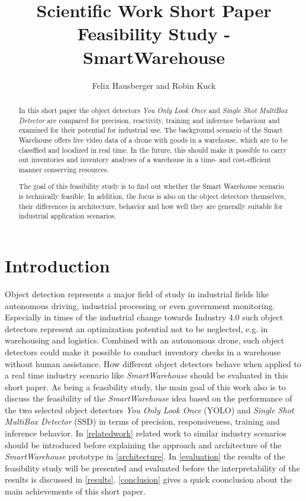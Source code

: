 \documentclass[a4paper, 10pt, journal]{wissarbIEEE}      %
\title{\LARGE \bf Scientific Work Short Paper \\Feasibility Study - SmartWarehouse}
\author{Felix Hausberger and Robin Kuck}
\begin{document}
\maketitle

\begin{abstract}

In this short paper the object detectors \textit{You Only Look Once} and \textit{Single Shot MultiBox Detector} are compared for precision, reactivity, training and inference behaviour and examined for their potential for industrial use. The background scenario of the Smart Warehouse offers live video data of a drone with goods in a warehouse, which are to be classffied and localized in real time. In the future, this should make it possible to carry out inventories and inventory analyses of a warehouse in a time- and cost-efficient manner conserving resources.

The goal of this feasibility study is to find out whether the Smart Warehouse scenario is technically feasible. In addition, the focus is also on the object detectors themselves, their differences in architecture, behavior and how well they are generally suitable for industrial application scenarios.

\end{abstract}

\section{Introduction}

Object detection represents a major field of study in industrial fields like autonomous driving, industrial processing or even government monitoring. Especially in times of the industrial change towards Industry 4.0 such object detectors represent an optimization potential not to be neglected, e.g. in warehousing and logistics. Combined with an autonomous drone, such object detectors could make it possible to conduct inventory checks in a warehouse without human assistance. How different object detectors behave when applied to a real time industry scenario like \textit{SmartWarehouse} should be evaluated in this short paper. As being a feasibility study, the main goal of this work also is to discuss the feasibility of the \textit{SmartWarehouse} idea based on the performance of the two selected object detectors \textit{You Only Look Once} (YOLO) and \textit{Single Shot MultiBox Detector} (SSD) in terms of precision, responsiveness, training and inference behavior. In \autoref{relatedwork} related work to similar industry scenarios should be introduced before explaining the approach and architecture of the \textit{SmartWarehouse} prototype in \autoref{architecture}. In \autoref{evaluation} the results of the feasibility study will be presented and evaluated before the interpretability of the results is discussed in \autoref{results}. \autoref{conclusion} gives a quick coonclusion about the main achievements of this short paper.
\end{document}

